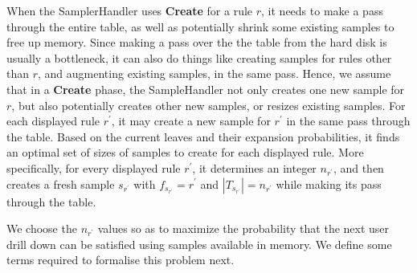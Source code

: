 When the SamplerHandler uses \textbf{Create} for a rule $r$, it needs to make a pass through the entire table, as well as potentially shrink some existing samples to free up memory. Since making a pass over the the table from the hard disk is usually a bottleneck, it can also do things like creating samples for rules other than $r$, and augmenting existing samples, in the same pass. Hence, we assume that in a \textbf{Create} phase, the SampleHandler not only creates one new sample for $r$, but also potentially creates other new samples, or resizes existing samples. For each displayed rule $r^{\prime}$, it may create a new sample for $r^{\prime}$ in the same pass through the table. Based on the current leaves and their expansion probabilities, it finds an optimal set of sizes of samples to create for each displayed rule. More specifically, for every displayed rule $r^{\prime}$, it determines an integer $n_{r^{\prime}}$, and then creates a fresh sample $s_{r^{\prime}}$ with $f_{s_{r^{\prime}}} = r^{\prime}$ and $|T_{s_{r^{\prime}}}| = n_{r^{\prime}}$ while making its pass through the table. 

We choose the $n_{r^{\prime}}$ values so as to maximize the probability that the next user drill down can be satisfied using samples available in memory. We define some terms required to formalise this problem next. 

